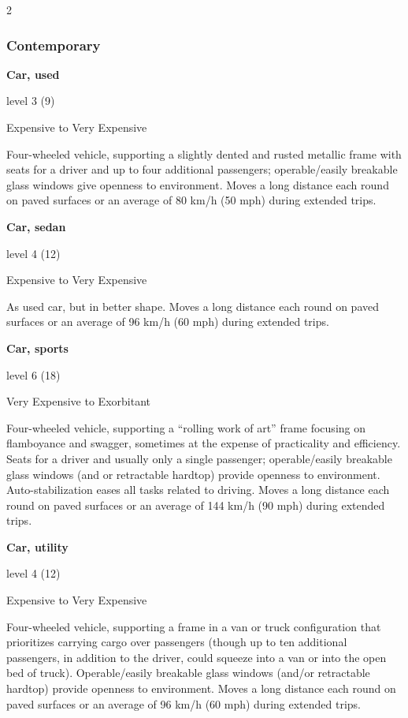 \begin{multicols}{2}

\subsubsection{Contemporary}

\textbf{Car, used}

level 3 (9) 

Expensive to Very Expensive 

Four-wheeled vehicle, supporting a slightly dented and rusted metallic frame with seats for a driver and up to four additional passengers; operable/easily breakable glass windows give openness to environment. Moves a long distance each round on paved surfaces or an average of 80 km/h (50 mph) during extended trips. 

\textbf{Car, sedan} 

level 4 (12) 

Expensive to Very Expensive 

As used car, but in better shape. Moves a long distance each round on paved surfaces or an average of 96 km/h (60 mph) during extended trips.

\textbf{Car, sports}

level 6 (18) 

Very Expensive to Exorbitant 

Four-wheeled vehicle, supporting a “rolling work of art” frame focusing on flamboyance and swagger, sometimes at the expense of practicality and efficiency. Seats for a driver and usually only a single passenger; operable/easily breakable glass windows (and or retractable hardtop) provide openness to environment. Auto-stabilization eases all tasks related to driving. Moves a long distance each round on paved surfaces or an average of 144 km/h (90 mph) during extended trips. 

\textbf{Car, utility} 

level 4 (12) 

Expensive to Very Expensive 

Four-wheeled vehicle, supporting a frame in a van or truck configuration that prioritizes carrying cargo over passengers (though up to ten additional passengers, in addition to the driver, could squeeze into a van or into the open bed of truck). Operable/easily breakable glass windows (and/or retractable hardtop) provide openness to environment. Moves a long distance each round on paved surfaces or an average of 96 km/h (60 mph) during extended trips.


\end{multicols}

